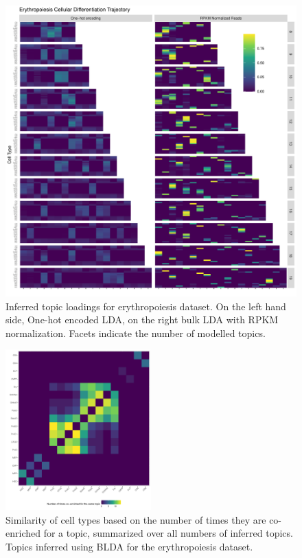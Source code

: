\begin{figure}
  \centering
  \includegraphics[width=\textwidth]{plot/ch4/ludwig_quick_topics.pdf}
  \caption{Inferred topic loadings for erythropoiesis dataset. On the left hand side, One-hot encoded LDA, on the right bulk LDA with RPKM normalization. Facets indicate the number of modelled topics. }
  \label{fig:ludwig_quick_topics}
\end{figure}

\begin{figure}
  \centering
  \includegraphics[width=0.5\textwidth]{plot/ch4/ludwig_coenriched.pdf}
  \caption{Similarity of cell types based on the number of times they are co-enriched for a topic, summarized over all numbers of inferred topics. Topics inferred using BLDA for the erythropoiesis dataset.}
  \label{fig:ludwig_quick_coenriched}
\end{figure}

